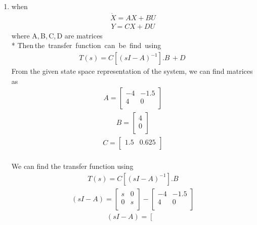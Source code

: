 \begin{enumerate}[label=\thesection.\arabic*.,ref=\thesection.\theenumi]
\item 
\solution
when
\begin{align}
    \dot{X} = AX + BU
\end{align}
\begin{align}
    Y = CX + DU
\end{align}
\vskip 0.1cm
where \; A,\,B,\,C,\,D \; are matrices 
  \\* Then\,the\, transfer\, function\, can\, be\, find\, using
\vskip 0.1cm
\begin{align}
    T(s) = C[(sI-A)^{-1}].B \,+ D\
\end{align}
\vskip 0.1cm
From the given state space representation of the system, we can find matrices as
\begin{align}
    A=
  \left[ {\begin{array}{cc}
   -4 & -1.5 \\
   4 & 0 \\
  \end{array} } \right]
\end{align}
\begin{align}
    B = \left[ {\begin{array}{cc}
      4 \\
      0 \\
  \end{array} }\right]
\end{align}
\begin{align}
     C = \left[ {\begin{array}{cc}
   1.5 & 0.625 \\
  \end{array} }\right]
\end{align}
\\We can find the transfer function using
\begin{align}
    T(s) = C[(sI - A)^{-1}].B
\end{align}
\begin{align}
    (sI - A) = \left[ {\begin{array}{cc}
   s & 0 \\
   0 & s \\
  \end{array} } \right] - \left[ {\begin{array}{cc}
   -4 & -1.5 \\
   4 & 0 \\
  \end{array} } \right]
\end{align}
\begin{align}
    (sI - A) = \left[ {\begin{array}{cc}

\end{array}}
\end{align}
\end{enumerate}
